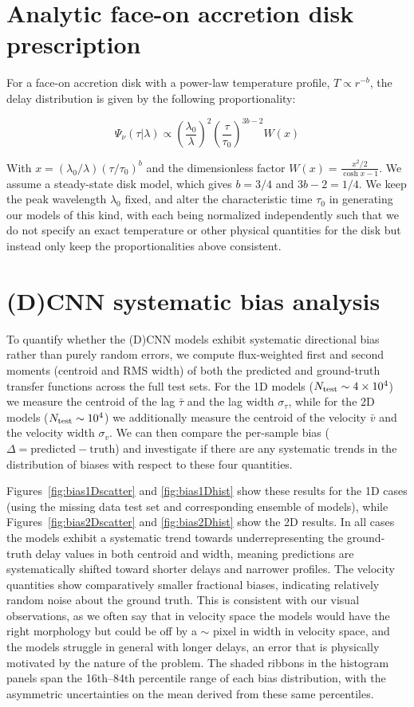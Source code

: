 \documentclass[floatfix,twocolumn,trackchanges,linenumbers]{aastex7}
\begin{document}
\section{Analytic face-on accretion disk prescription}\label{sec:KDM}
For a face-on accretion disk with a power-law temperature profile, $T \propto r^{-b}$, the delay distribution is given by the following proportionality:

\begin{equation}
\Psi_\nu(\tau|\lambda) \propto \left(\frac{\lambda_0}{\lambda}\right)^2\left(\frac{\tau}{\tau_0}\right)^{3b-2} W(x)
\end{equation}

With $x = (\lambda_0/\lambda)(\tau/\tau_0)^b$ and the dimensionless factor $W(x) = \frac{x^2/2}{\cosh x -1}$. We assume a steady-state disk model, which gives $b=3/4$ and $3b-2=1/4$. We keep the peak wavelength $\lambda_0$ fixed, and alter the characteristic time $\tau_0$ in generating our models of this kind, with each being normalized independently such that we do not specify an exact temperature or other physical quantities for the disk but instead only keep the proportionalities above consistent.
\section{(D)CNN systematic bias analysis}\label{sec:bias}
To quantify whether the (D)CNN models exhibit systematic directional bias rather than purely random errors, we compute flux-weighted first and second moments (centroid and RMS width) of both the predicted and ground-truth transfer functions across the full test sets.
For the 1D models ($N_{\rm{test}}\sim 4\times 10^4$) we measure the centroid of the lag $\bar{\tau}$ and the lag width $\sigma_\tau$,
while for the 2D models ($N_{\rm{test}}\sim 10^4$) we additionally measure the centroid of the velocity $\bar{v}$ and the velocity width $\sigma_v$.
We can then compare the per-sample bias ($\Delta = \text{predicted} - \text{truth}$) and investigate if there are any systematic trends in the distribution of biases with
respect to these four quantities.

Figures~\ref{fig:bias1Dscatter} and \ref{fig:bias1Dhist} show these results for the 1D cases (using the missing data test set and corresponding ensemble of models),
while Figures~\ref{fig:bias2Dscatter} and \ref{fig:bias2Dhist} show the 2D results.
In all cases the models exhibit a systematic trend towards underrepresenting the ground-truth delay values in both centroid and width,
meaning predictions are systematically shifted toward shorter delays and narrower profiles.
The velocity quantities show comparatively smaller fractional biases, indicating relatively random noise about the ground truth. This is
consistent with our visual observations, as we often say that in velocity space the models would have the right morphology but could be off by a $\sim$ pixel
in width in velocity space, and the models struggle in general with longer delays, an error that is physically motivated by the nature of the problem.
The shaded ribbons in the histogram panels span the 16th--84th percentile range of each bias distribution,
with the asymmetric uncertainties on the mean derived from these same percentiles.
\end{document}
